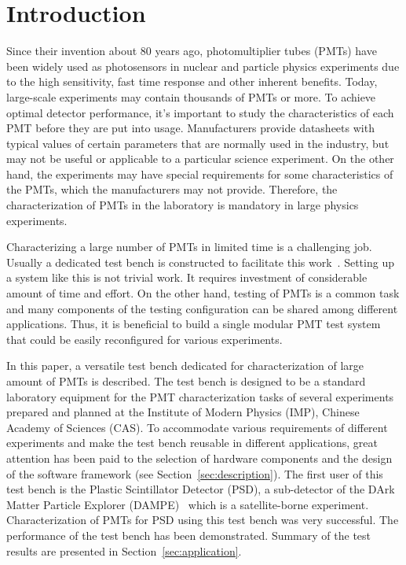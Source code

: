 \documentclass{nst}
\begin{document}

\maketitle


\section{Introduction}
\label{sec:introduction}

Since their invention about 80 years ago, photomultiplier tubes (PMTs) have been widely used as photosensors in nuclear and particle physics experiments due to the high sensitivity, fast time response and other inherent benefits. 
Today, large-scale experiments may contain thousands of PMTs or more. To achieve optimal detector performance, it's important to study the characteristics of each PMT before they are put into usage. 
Manufacturers provide datasheets with typical values of certain parameters that are normally used in the industry, but may not be useful or applicable to a particular science experiment.
On the other hand, the experiments may have special requirements for some characteristics of the PMTs, which the manufacturers may not provide. 
Therefore, the characterization of PMTs in the laboratory is mandatory in large physics experiments.

Characterizing a large number of PMTs in limited time is a challenging job. Usually a dedicated test bench is constructed to facilitate this work~\cite{barnhill_testing_2008,akgun_complete_2005,adragna_pmt-block_2006}.
Setting up a system like this is not trivial work. It requires investment of considerable amount of time and effort.
On the other hand, testing of PMTs is a common task and many components of the testing configuration can be shared among different applications.
Thus, it is beneficial to build a single modular PMT test system that could be easily reconfigured for various experiments.

In this paper, a versatile test bench dedicated for characterization of large amount of PMTs is described.
The test bench is designed to be a standard laboratory equipment for the PMT characterization tasks of several experiments prepared and planned at the Institute of Modern Physics (IMP), Chinese Academy of Sciences (CAS).
To accommodate various requirements of different experiments and make the test bench reusable in different applications, great attention has been paid to the selection of  hardware components and the design of the software framework (see Section~\ref{sec:description}).
The first user of this test bench is the Plastic Scintillator Detector (PSD), a sub-detector of the DArk Matter Particle Explorer (DAMPE)~\cite{Chang_Jin_dampe} which is a satellite-borne experiment. 
Characterization of PMTs for PSD using this test bench was very successful. The performance of the test bench has been demonstrated.
Summary of the test results are presented in Section~\ref{sec:application}.
\end{document}
